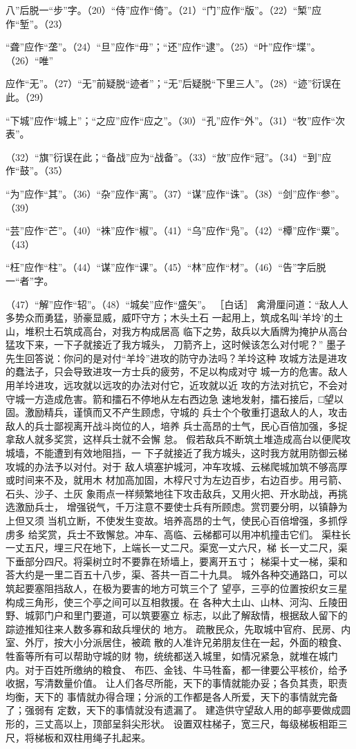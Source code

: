 \documentclass[12pt,UTF8]{ctexbook}
\begin{document}
八”后脱一“步”字。（20）“侍”应作“倚”。（21）“门”应作“版”。（22）“椠”应作“堑”。（23） 

“聋”应作“垄”。（24）“旦”应作“毋”；“还”应作“逮”。（25）“叶”应作“堞”。（26）“唯” 

应作“无”。（27）“无”前疑脱“迹者”；“无”后疑脱“下里三人”。（28）“迹”衍误在此。（29） 

“下城”应作“城上”；“之应”应作“应之”。（30）“孔”应作“外”。（31）“牧”应作“次表”。 

（32）“旗”衍误在此；“备战”应为“战备”。（33）“放”应作“冠”。（34）“到”应作“鼓”。（35） 

“为”应作“其”。（36）“杂”应作“离”。（37）“谋”应作“诛”。（38）“剑”应作“参”。（39） 

“芸”应作“芒”。（40）“袾”应作“椒”。（41）“乌”应作“凫”。（42）“橝”应作“粟”。（43） 

“枉”应作“柱”。（44）“谋”应作“课”。（45）“林”应作“材”。（46）“告”字后脱一“者”字。 

（47）“解”应作“轺”。（48）“城矣”应作“盛矢”。 
［白话］ 
禽滑厘问道：“敌人人多势众而勇猛，骄豪显威，威吓守方；木头土石 
一起用上，筑成名叫‘羊坽’的土山，堆积土石筑成高台，对我方构成居高 
临下之势，敌兵以大盾牌为掩护从高台猛攻下来，一下子就接近了我方城头， 
刀箭齐上，这时候该怎么对付呢？” 
墨子先生回答说：你问的是对付“羊坽”进攻的防守办法吗？羊坽这种 
攻城方法是进攻的蠢法子，只会导致进攻一方士兵的疲劳，不足以构成对守 
城一方的危害。敌人用羊坽进攻，远攻就以远攻的办法对付它，近攻就以近 
攻的方法对抗它，不会对守城一方造成危害。箭和擂石不停地从左右西边急 
速地发射，擂石接后，□望以固。激励精兵，谨慎而又不产生顾虑，守城的 
兵士个个敬重打退敌人的人，攻击敌人的兵士鄙视离开战斗岗位的人，培养 
兵士高昂的士气，民心百倍加强，多捉拿敌人就多奖赏，这样兵士就不会懈 
怠。 
假若敌兵不断筑土堆造成高台以便爬攻城墙，不能遭到有效地阻挡，一 
下子就接近了我方城头，这时我方就用防御云梯攻城的办法予以对付。对于 
敌人填塞护城河，冲车攻城、云梯爬城加筑不够高厚或时间来不及，就用木 
材加高加固，木椁尺寸为左边百步，右边百步。用弓箭、石头、沙子、土灰 
象雨点一样频繁地往下攻击敌兵，又用火把、开水助战，再挑选激励兵士， 
增强锐气，千万注意不要使士兵有所顾虑。赏罚要分明，以镇静为上但又须 
当机立断，不使发生变故。培养高昂的士气，使民心百倍增强，多抓俘虏多 
给奖赏，兵士不致懈怠。冲车、高临、云梯都可以用冲机撞击它们。 
渠柱长一丈五尺，埋三尺在地下，上端长一丈二尺。渠宽一丈六尺，梯 
长一丈二尺，渠下垂部分四尺。将渠树立时不要靠在矫墙上，要离开五寸； 
梯渠十丈一梯，渠和荅大约是一里二百五十八步，渠、荅共一百二十九具。 
城外各种交通路口，可以筑起要塞阻挡敌人，在极为要害的地方可筑三个了 
望亭，三亭的位置按织女三星构成三角形，使三个亭之间可以互相救援。在 
各种大土山、山林、河沟、丘陵田野、城郭门户和里门要道，可以筑要塞立 
标志，以此了解敌情，根据敌人留下的踪迹推知往来人数多寡和敌兵埋伏的 
地方。 
疏散民众，先取城中官府、民房、内室、外厅，按大小分派居住，被疏 
散的人准许兄弟朋友住在一起，外面的粮食、牲畜等所有可以帮助守城的财 
物，统统都送入城里，如情况紧急，就堆在城门内。对于百姓所缴纳的粮食、 
布匹、金钱、牛马牲畜，都一律要公平核价，给予收据，写清数量价值。 
让人们各尽所能，天下的事情就能办妥；各负其责，职责均衡，天下的 
事情就办得合理；分派的工作都是各人所爱，天下的事情就完备了；强弱有 
定数，天下的事情就没有遗漏了。 
建造供守望敌人用的邮亭要做成圆形的，三丈高以上，顶部呈斜尖形状。 
设置双柱梯子，宽三尺，每级梯板相距三尺，将梯板和双柱用绳子扎起来。 
\end{document}
